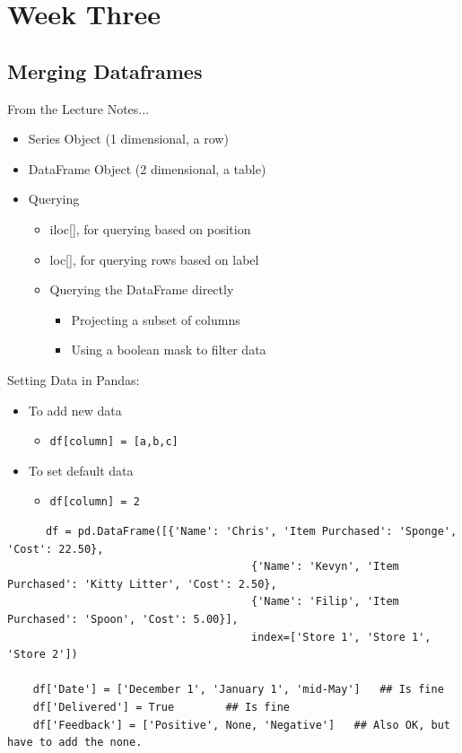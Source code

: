 \documentclass[11pt]{article}
\begin{document}
\newpage
\section{Week Three}

    \subsection{Merging Dataframes}
    From the Lecture Notes... 
    \begin{itemize}
      \item{Series Object (1 dimensional, a row)}
      \item{DataFrame Object (2 dimensional, a table)}
      \item{Querying}
         \begin{itemize}
           \item{iloc[], for querying based on position}
            \item{loc[], for querying rows based on label}
           \item{Querying the DataFrame directly}
              \begin{itemize}
                \item{Projecting a subset of columns}
                \item{Using a boolean mask to filter data}
              \end{itemize}
         \end{itemize}
       \end{itemize}
       
       Setting Data in Pandas:
       \begin{itemize}
         \item{To add new data}
           \begin{itemize}
             \item{{\tt df[column] = [a,b,c]}}
           \end{itemize}
         \item{To set default data}
           \begin{itemize}
             \item{{\tt df[column] = 2}}
           \end{itemize}
       \end{itemize}


    \begin{lstlisting}
      df = pd.DataFrame([{'Name': 'Chris', 'Item Purchased': 'Sponge', 'Cost': 22.50},
                                      {'Name': 'Kevyn', 'Item Purchased': 'Kitty Litter', 'Cost': 2.50},
                                      {'Name': 'Filip', 'Item Purchased': 'Spoon', 'Cost': 5.00}],
                                      index=['Store 1', 'Store 1', 'Store 2'])

    df['Date'] = ['December 1', 'January 1', 'mid-May']   ## Is fine
    df['Delivered'] = True        ## Is fine
    df['Feedback'] = ['Positive', None, 'Negative']   ## Also OK, but have to add the none.
    \end{lstlisting}
\end{document}
